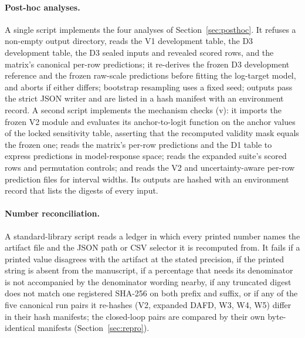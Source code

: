 \documentclass[11pt,a4paper]{article}
\begin{document}
\paragraph{Post-hoc analyses.} A single script implements the four analyses
of Section~\ref{sec:posthoc}. It refuses a non-empty output directory, reads
the V1 development table, the D3 development table, the D3 sealed inputs and
revealed scored rows, and the matrix's canonical per-row predictions; it
re-derives the frozen D3 development reference and the frozen raw-scale
predictions before fitting the log-target model, and aborts if either
differs; bootstrap resampling uses a fixed seed; outputs pass the strict JSON
writer and are listed in a hash manifest with an environment record. A second
script implements the mechanism checks (v): it imports the frozen V2 module
and evaluates its anchor-to-logit function on the anchor values of the
locked sensitivity table, asserting that the recomputed validity mask equals
the frozen one; reads the matrix's per-row predictions and the D1 table to
express predictions in model-response space; reads the expanded suite's
scored rows and permutation controls; and reads the V2 and uncertainty-aware
per-row prediction files for interval widths. Its outputs are hashed with an
environment record that lists the digests of every input.

\paragraph{Number reconciliation.} A standard-library script reads a ledger
in which every printed number names the artifact file and the JSON path or
CSV selector it is recomputed from. It fails if a printed value disagrees
with the artifact at the stated precision, if the printed string is absent
from the manuscript, if a percentage that needs its denominator is not
accompanied by the denominator wording nearby, if any truncated digest does
not match one registered SHA-256 on both prefix and suffix, or if any of the
five canonical run pairs it re-hashes (V2, expanded DAFD, W3, W4, W5) differ in
their hash manifests; the closed-loop pairs are compared by their own
byte-identical manifests (Section~\ref{sec:repro}).

\clearpage
\end{document}
